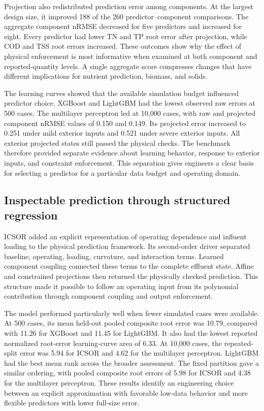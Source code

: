 Projection also redistributed prediction error among components. At the largest design size, it improved 188 of the 260 predictor--component comparisons. The aggregate component nRMSE decreased for five predictors and increased for eight. Every predictor had lower TN and TP root error after projection, while COD and TSS root errors increased. These outcomes show why the effect of physical enforcement is most informative when examined at both component and reported-quantity levels. A single aggregate score compresses changes that have different implications for nutrient prediction, biomass, and solids.

The learning curves showed that the available simulation budget influenced predictor choice. XGBoost and LightGBM had the lowest observed raw errors at 500 cases. The multilayer perceptron led at 10,000 cases, with raw and projected component nRMSE values of 0.150 and 0.149. Its projected error increased to 0.251 under mild exterior inputs and 0.521 under severe exterior inputs. All exterior projected states still passed the physical checks. The benchmark therefore provided separate evidence about learning behavior, response to exterior inputs, and constraint enforcement. This separation gives engineers a clear basis for selecting a predictor for a particular data budget and operating domain.

\subsection{Inspectable prediction through structured regression}

ICSOR added an explicit representation of operating dependence and influent loading to the physical prediction framework. Its second-order driver separated baseline, operating, loading, curvature, and interaction terms. Learned component coupling connected these terms to the complete effluent state. Affine and constrained projections then returned the physically checked prediction. This structure made it possible to follow an operating input from its polynomial contribution through component coupling and output enforcement.

The model performed particularly well when fewer simulated cases were available. At 500 cases, its mean held-out pooled composite root error was 10.79, compared with 11.26 for XGBoost and 11.45 for LightGBM. It also had the lowest reported normalized root-error learning-curve area of 6.33. At 10,000 cases, the repeated-split error was 5.94 for ICSOR and 4.62 for the multilayer perceptron. LightGBM had the best mean rank across the broader assessment. The fixed partition gave a similar ordering, with pooled composite root errors of 5.98 for ICSOR and 4.38 for the multilayer perceptron. These results identify an engineering choice between an explicit approximation with favorable low-data behavior and more flexible predictors with lower full-size error.

